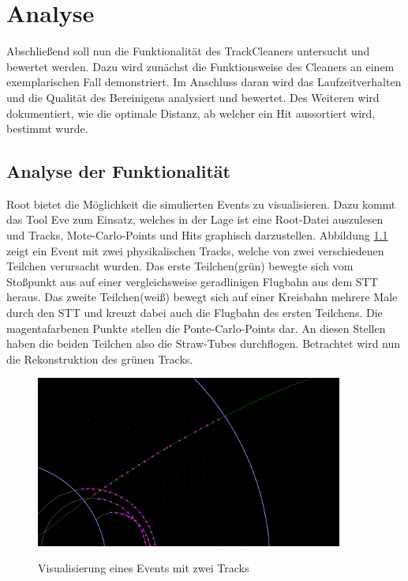 \chapter{Analyse}
Abschließend soll nun die Funktionalität des TrackCleaners untersucht und bewertet werden. Dazu wird zunächst die Funktionsweise des Cleaners an einem exemplarischen Fall demonstriert. Im Anschluss daran wird das Laufzeitverhalten und die Qualität des Bereinigens analysiert und bewertet. Des Weiteren wird dokumentiert, wie die optimale Distanz, ab welcher ein Hit aussortiert wird, bestimmt wurde.

\section{Analyse der Funktionalität}
Root bietet die Möglichkeit die simulierten Events zu visualisieren. Dazu kommt das Tool Eve zum Einsatz, welches in der Lage ist eine Root-Datei auszulesen und Tracks, Mote-Carlo-Points und Hits graphisch darzustellen. Abbildung \ref{fig:points} zeigt ein Event mit zwei physikalischen Tracks, welche von zwei verschiedenen Teilchen verursacht wurden. Das erste Teilchen(grün) bewegte sich vom Stoßpunkt aus auf einer vergleichsweise geradlinigen Flugbahn aus dem STT heraus. Das zweite Teilchen(weiß) bewegt sich auf einer Kreisbahn mehrere Male durch den STT und kreuzt dabei auch die Flugbahn des ersten Teilchens. Die magentafarbenen Punkte stellen die Ponte-Carlo-Points dar. An diesen Stellen haben die beiden Teilchen also die Straw-Tubes durchflogen. Betrachtet wird nun die Rekonstruktion des grünen Tracks. 

\begin{figure}
  \includegraphics[width=0.9\textwidth]{Bilder/Points2}
	\label{fig:points}
	\caption{Visualisierung eines Events mit zwei Tracks}
\end{figure}


